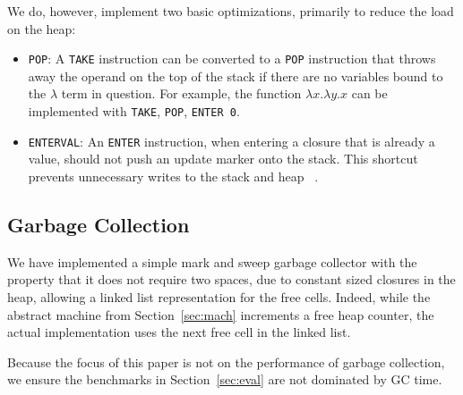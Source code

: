 We do, however, implement two basic optimizations, primarily to reduce the load
on the heap:

\begin{itemize}
\item \texttt{POP}: A \texttt{TAKE} instruction can be converted to a \texttt{POP}
instruction that throws away the operand on the top of the stack if there are no
variables bound to the $\lambda$ term in question. For example, the function
$\lambda x.\lambda y.x$ can be implemented with \texttt{TAKE}, \texttt{POP},
\texttt{ENTER 0}.  
\item \texttt{ENTERVAL}: An \texttt{ENTER} instruction, when entering a
closure that is already a value, should not push an update marker onto the
stack. This shortcut prevents unnecessary writes to the stack and heap
~\cite{jonesstg,lkm,sestoft}.  
\end{itemize}

\subsection{Garbage Collection}

We have implemented a simple mark and sweep garbage collector with the property
that it does not require two spaces, due to constant sized closures in the
heap, allowing a linked list representation for the free cells. Indeed,
while the abstract machine from Section~\ref{sec:mach} increments a free heap
counter, the actual implementation uses the next free cell in the linked list.

Because the focus of this paper is not on the performance of garbage collection,
we ensure the benchmarks in Section~\ref{sec:eval} are not dominated by GC time.

